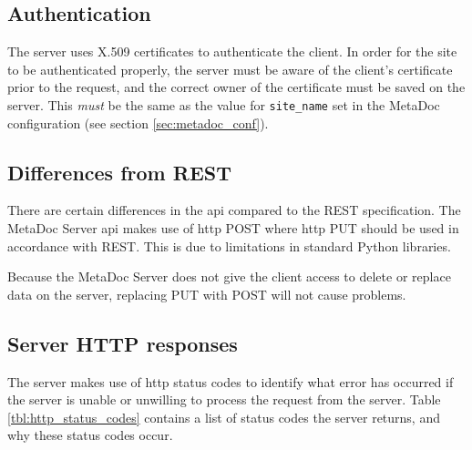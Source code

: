 \subsection{Authentication}
\label{sec:authentication}
The server uses X.509 certificates to authenticate the client. In order for the
site to be authenticated properly, the server must be aware of the client's
certificate prior to the request, and the correct owner of the certificate must
be saved on the server. This \textit{must} be the same as the value for
\texttt{site\_name} set in the MetaDoc configuration (see section
\ref{sec:metadoc_conf}).

\subsection{Differences from REST}
\label{sec:diff_from_rest}

There are certain differences in the \gls{api} compared to the REST
specification. The MetaDoc Server \gls{api} makes use of \gls{http} POST where
\gls{http} PUT should be used in accordance with REST. This is due to
limitations in standard Python libraries.

Because the MetaDoc Server does not give the client access to delete or replace
data on the server, replacing PUT with POST will not cause problems.

\subsection{Server HTTP responses}

The server makes use of \gls{http} status codes to identify what error has
occurred if the server is unable or unwilling to process the request from the
server.  Table \ref{tbl:http_status_codes} contains a list of status codes the
server returns, and why these status codes occur. 

